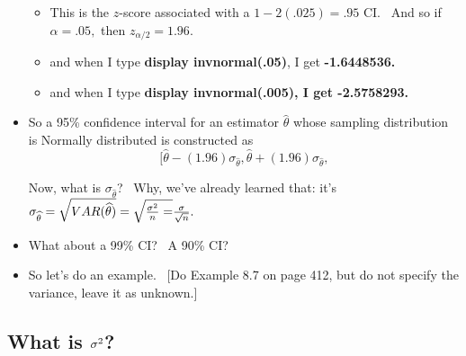 \documentclass[11pt]{article}
\begin{document}
\begin{itemize}
\begin{itemize}
\item This is the $z$-score associated with a $1-2\left( .025\right) =.95$
CI. \ And so if $\alpha =.05,$ then $z_{\alpha /2}=1.96.$

\item and when I type \textbf{display invnormal(.05)}, I get \textbf{%
-1.6448536.}

\item and when I type \textbf{display invnormal(.005), I get -2.5758293.}
\end{itemize}

\item So a 95\% confidence interval for an estimator $\widehat{\theta }$
whose sampling distribution is Normally distributed is constructed as%
\begin{equation*}
\lbrack \widehat{\theta }-\left( 1.96\right) \sigma _{\widehat{\theta }},%
\widehat{\theta }+\left( 1.96\right) \sigma _{\widehat{\theta }},
\end{equation*}

Now, what is $\sigma _{\widehat{\theta }}$? \ Why, we've already learned
that: it's $\sigma _{\widehat{\theta }}=\sqrt{VAR(\widehat{\theta })}=\sqrt{%
\frac{\sigma ^{2}}{n}=}\frac{\sigma }{\sqrt{n}}.$

\item What about a 99\% CI? \ A 90\% CI?

\item So let's do an example. \ [Do Example 8.7 on page 412, but do not
specify the variance, leave it as unknown.]
\end{itemize}

\subsection{What is $\protect\sigma ^{2}$?}
\end{document}
